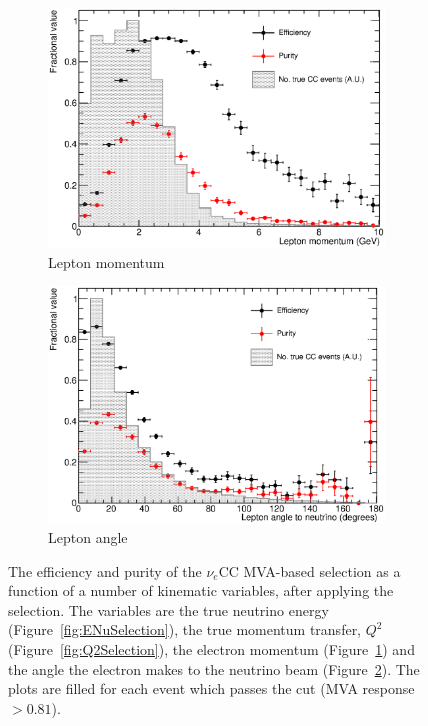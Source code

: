 \begin{figure}
\begin{subfigure}[t]{0.48\linewidth}
    \includegraphics[width=0.98\textwidth]{LeptonMomentumSelection.eps}
    \caption{Lepton momentum}
    \label{fig:LeptonMomentumSelection}
  \end{subfigure}
  \hfill
  \begin{subfigure}[t]{0.48\linewidth}
    \centering
    \includegraphics[width=0.98\textwidth]{LeptonAngleSelection.eps}
    \caption{Lepton angle}
    \label{fig:LeptonAngleSelection}
  \end{subfigure}
  \caption[The efficiency and purity of the $\nu_e$CC MVA-based selection as a function of a number of kinematic variables, after applying the selection.]{The efficiency and purity of the $\nu_e$CC MVA-based selection as a function of a number of kinematic variables, after applying the selection.  The variables are the true neutrino energy (Figure~\ref{fig:ENuSelection}), the true momentum transfer, $Q^2$ (Figure~\ref{fig:Q2Selection}), the electron momentum (Figure~\ref{fig:LeptonMomentumSelection}) and the angle the electron makes to the neutrino beam (Figure~\ref{fig:LeptonAngleSelection}).  The plots are filled for each event which passes the cut (MVA response $>0.81$).}
  \label{fig:EffPurSelection}
\end{figure}

